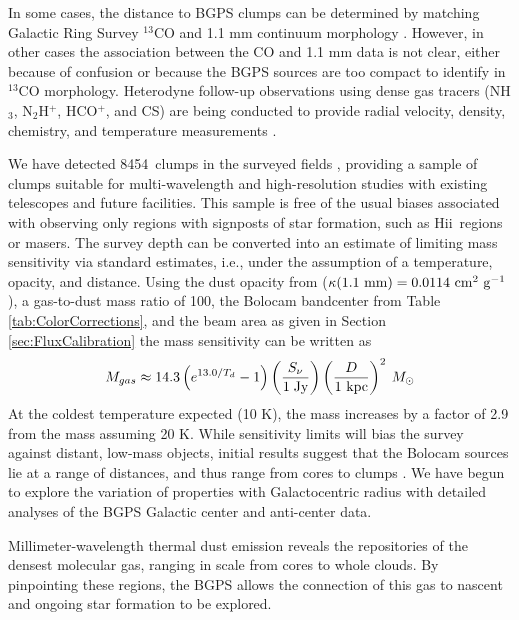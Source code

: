 \documentclass[12pt,preprint]{aastex}
\def\msol{\ifmmode {\>M_\odot}\else {$M_\odot$}\fi}
\newcommand{\hii}{H{\sc ii}}
\newcommand{\ncores}{8454}
\begin{document}
In some cases, the distance to BGPS clumps can be determined by
matching Galactic Ring Survey $^{13}$CO and 1.1 mm continuum
morphology \citep{IRDCdistance,jackson06}.  However, in other cases
the association between the CO and 1.1 mm data is not clear, either
because of confusion or because the BGPS sources are too compact to
identify in $^{13}$CO morphology.  Heterodyne follow-up observations
using dense gas tracers (NH$_3$, N$_2$H$^+$, HCO$^+$, and CS) are
being conducted to provide radial velocity, density, chemistry, and
temperature measurements \citep{schlingman10,dunham10}.  

We have detected \ncores\ clumps in the surveyed fields
\citep{rosolowsky10}, providing a sample of clumps suitable for
multi-wavelength and high-resolution studies with existing telescopes
and future facilities.  This sample is free of the usual biases
associated with observing only regions with signposts of star
formation, such as \hii\ regions or masers. The survey depth can be
converted into an estimate of limiting mass sensitivity via standard
estimates, i.e., under the assumption of a temperature, opacity, and
distance.  Using the dust opacity from \citet{ossenkopf94}
($\kappa({\rm 1.1~mm}) = 0.0114~{\rm cm^{2}~ g^{-1}}$), a gas-to-dust
mass ratio of 100, the Bolocam bandcenter from Table
\ref{tab:ColorCorrections}, and the beam area as given in Section
\ref{sec:FluxCalibration} the mass sensitivity can be written as
\begin{equation} 
\label{eq:Mass}
M_{gas}\approx
14.3 \left( e^{13.0/T_d}-1 \right) \left({S_\nu\over 1\; {\rm Jy}} \right)
\left(\frac{D}{{\rm 1~kpc}}\right)^{2} \msol 
\end{equation}
 At the coldest temperature expected (10 K), the mass increases by a
factor of 2.9 from the mass assuming 20 K.  While sensitivity limits
will bias the survey against distant, low-mass objects, initial
results suggest that the Bolocam sources lie at a range of distances,
and thus range from cores to clumps \citep{rosolowsky10}.  We have
begun to explore the variation of properties with Galactocentric
radius with detailed analyses of the BGPS Galactic center
\citep{bally10} and anti-center \citep{dunham10} data.

Millimeter-wavelength thermal dust emission reveals the repositories
of the densest molecular gas, ranging in scale from cores to whole
clouds. By pinpointing these regions, the BGPS allows the connection
of this gas to nascent and ongoing star formation to be explored.
\end{document}
